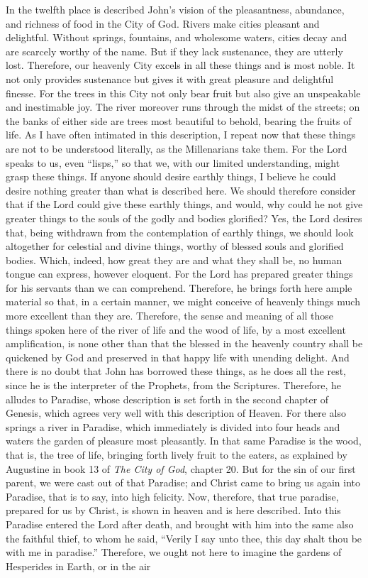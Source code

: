 In the twelfth place is described John’s vision of the pleasantness, abundance, and richness of food in the City of God. Rivers make cities pleasant and delightful. Without springs, fountains, and wholesome waters, cities decay and are scarcely worthy of the name. But if they lack sustenance, they are utterly lost. Therefore, our heavenly City excels in all these things and is most noble. It not only provides sustenance but gives it with great pleasure and delightful finesse. For the trees in this City not only bear fruit but also give an unspeakable and inestimable joy. The river moreover runs through the midst of the streets; on the banks of either side are trees most beautiful to behold, bearing the fruits of life. As I have often intimated in this description, I repeat now that these things are not to be understood literally, as the Millenarians take them. For the Lord speaks to us, even “lisps,” so that we, with our limited understanding, might grasp these things. If anyone should desire earthly things, I believe he could desire nothing greater than what is described here. We should therefore consider that if the Lord could give these earthly things, and would, why could he not give greater things to the souls of the godly and bodies glorified? Yes, the Lord desires that, being withdrawn from the contemplation of earthly things, we should look altogether for celestial and divine things, worthy of blessed souls and glorified bodies. Which, indeed, how great they are and what they shall be, no human tongue can express, however eloquent. For the Lord has prepared greater things for his servants than we can comprehend. Therefore, he brings forth here ample material so that, in a certain manner, we might conceive of heavenly things much more excellent than they are. Therefore, the sense and meaning of all those things spoken here of the river of life and the wood of life, by a most excellent amplification, is none other than that the blessed in the heavenly country shall be quickened by God and preserved in that happy life with unending delight. And there is no doubt that John has borrowed these things, as he does all the rest, since he is the interpreter of the Prophets, from the Scriptures. Therefore, he alludes to Paradise, whose description is set forth in the second chapter of Genesis, which agrees very well with this description of Heaven. For there also springs a river in Paradise, which immediately is divided into four heads and waters the garden of pleasure most pleasantly. In that same Paradise is the wood, that is, the tree of life, bringing forth lively fruit to the eaters, as explained by Augustine in book 13 of \textit{The City of God}, chapter 20. But for the sin of our first parent, we were cast out of that Paradise; and Christ came to bring us again into Paradise, that is to say, into high felicity. Now, therefore, that true paradise, prepared for us by Christ, is shown in heaven and is here described. Into this Paradise entered the Lord after death, and brought with him into the same also the faithful thief, to whom he said, “Verily I say unto thee, this day shalt thou be with me in paradise.” Therefore, we ought not here to imagine the gardens of Hesperides in Earth, or in the air 
